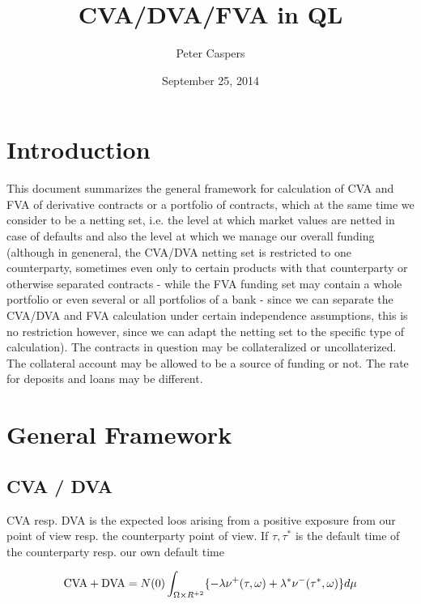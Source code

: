 \documentclass{amsart}
\theoremstyle{plain}
\numberwithin{equation}{section}
\begin{document}
\title[CVA/FVA in QL]{CVA/DVA/FVA in QL}
\author{Peter Caspers}
\date{September 25, 2014}
\begin{abstract}
\end{abstract}
\maketitle

\section{Introduction}

This document summarizes the general framework for calculation of CVA and FVA of derivative contracts or
a portfolio of contracts, which at the same time we consider to be a netting set, i.e. the level at which
market values are netted in case of defaults and also the level at which we manage our overall funding (although
in geneneral, the CVA/DVA netting set is restricted to one counterparty, sometimes even only to certain products with
that counterparty or otherwise separated contracts - while the FVA funding set may contain a whole portfolio or even
several or all portfolios of a bank - since we can separate the CVA/DVA and FVA calculation under certain independence
assumptions, this is no restriction however, since we can adapt the netting set to the specific type of calculation). 
The contracts in question may be collateralized or uncollaterized. The collateral account may be allowed to be a source of
funding or not. The rate for deposits and loans may be different.

\section{General Framework}

\subsection{CVA / DVA}

CVA resp. DVA is the expected loos arising from a positive exposure from our point of view resp. the counterparty
point of view. If $\tau, \tau^*$ is the default time of the counterparty resp. our own default time

\begin{equation}
\textnormal{CVA} + \textnormal{DVA} = N(0) \int_{\Omega\times R^{+2}} \{ -\lambda \nu^+(\tau,\omega) + \lambda^* \nu^-(\tau^*,\omega) \} d\mu 
\end{equation}
\end{document}
